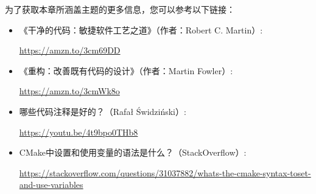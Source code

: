 为了获取本章所涵盖主题的更多信息，您可以参考以下链接：

\begin{itemize}
\item
《干净的代码：敏捷软件工艺之道》（作者：Robert C. Martin）:

\url{https://amzn.to/3cm69DD}

\item
《重构：改善既有代码的设计》（作者：Martin Fowler）:

\url{https://amzn.to/3cmWk8o}

\item
哪些代码注释是好的？（Rafał Świdziński）:

\url{https://youtu.be/4t9bpo0THb8}

\item
CMake中设置和使用变量的语法是什么？（StackOverflow）:

\url{https://stackoverflow.com/questions/31037882/whats-the-cmake-syntax-toset-and-use-variables}
\end{itemize}





















